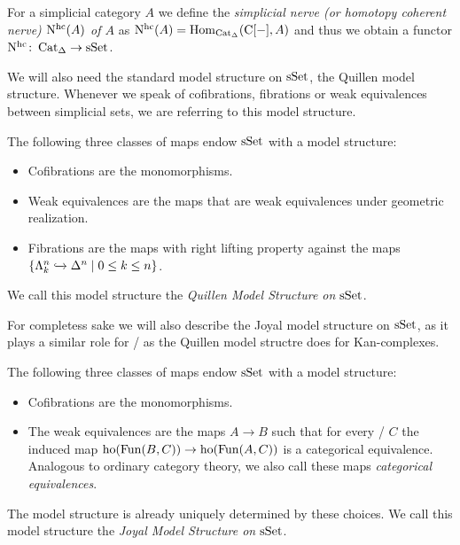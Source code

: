 \begin{definition} %
    For a simplicial category $A$ we define the \emph{simplicial nerve (or homotopy coherent nerve) $\operatorname{N^{hc}}(A)$ of $A$} as $\operatorname{N^{hc}}(A)=\operatorname{Hom}_{\operatorname{Cat}_{\Delta}}(\operatorname{C}[-],A)$ and thus we obtain a functor $\operatorname{N^{hc}}\colon\operatorname{Cat}_{\Delta}\to\operatorname{sSet}$.
\end{definition}
We will also need the standard model structure on $\operatorname{sSet}$, the Quillen model structure. 
Whenever we speak of cofibrations, fibrations or weak equivalences between simplicial sets, we are referring to this model structure.
\begin{prop}
    The following three classes of maps endow $\operatorname{sSet}$ with a model structure:
    \begin{itemize}
        \item Cofibrations are the monomorphisms.
        \item Weak equivalences are the maps that are weak equivalences under geometric realization. %
        \item Fibrations are the maps with right lifting property against the maps $\left\lbrace\Lambda_k^n\xhookrightarrow{}\Delta^n\mid 0\leq k\leq n\right\rbrace$.
    \end{itemize}
    We call this model structure the \emph{Quillen Model Structure on $\operatorname{sSet}$}.
\end{prop}
For completess sake we will also describe the Joyal model structure on $\operatorname{sSet}$, as it plays a similar role for \inftycats/ as the Quillen model structre does for Kan-complexes.
\begin{prop}
    The following three classes of maps endow $\operatorname{sSet}$ with a model structure:
    \begin{itemize}
        \item Cofibrations are the monomorphisms.
        \item The weak equivalences are the maps $A\to B$ such that for every \inftycat/ $C$ the induced map $\operatorname{ho}(\operatorname{Fun}(B,C))\to\operatorname{ho}(\operatorname{Fun}(A,C))$ is a categorical equivalence.
            Analogous to ordinary category theory, we also call these maps \emph{categorical equivalences}.
    \end{itemize}
    The model structure is already uniquely determined by these choices.
    We call this model structure the \emph{Joyal Model Structure on $\operatorname{sSet}$}.
\end{prop}
